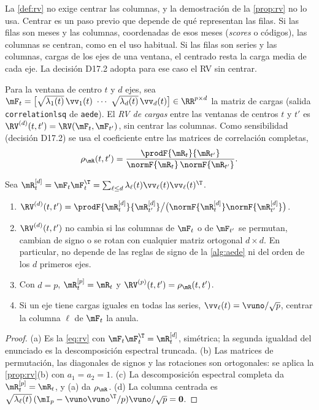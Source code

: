 La \cref{def:rv} no exige centrar las columnas, y la demostración de la \cref{prop:rv} no lo usa.
Centrar es un paso previo que depende de qué representan las filas. Si las filas son meses y las
columnas, coordenadas de esos meses (\emph{scores} o códigos), las columnas se centran, como en el
uso habitual. Si las filas son series y las columnas, cargas de los ejes de una ventana, el
centrado resta la carga media de cada eje. La decisión D17.2 adopta para ese caso el RV sin
centrar.

\begin{definicion}\label{def:rv-cargas}
Para la ventana de centro $t$ y $d$ ejes, sea
$\mF_t=\bigl[\sqrt{\lambda_1(t)}\,\vv_1(t)\ \cdots\ \sqrt{\lambda_d(t)}\,\vv_d(t)\bigr]\in
\RR^{p\times d}$ la matriz de cargas (salida \texttt{correlationlsq} de \texttt{aede}). El
\emph{RV de cargas} entre las ventanas de centros $t$ y $t'$ es $\RV^{(d)}(t,t')=\RV(\mF_t,
\mF_{t'})$, sin centrar las columnas. Como sensibilidad (decisión D17.2) se usa el coeficiente
entre las matrices de correlación completas,
\[
  \rho_{\mR}(t,t')=\frac{\prodF{\mR_t}{\mR_{t'}}}{\normF{\mR_t}\,\normF{\mR_{t'}}}.
\]
\end{definicion}

\begin{proposicion}\label{prop:rv-cargas}
Sea $\mR^{[d]}_t=\mF_t\mF_t^{\T}=\sum_{\ell\le d}\lambda_\ell(t)\vv_\ell(t)\vv_\ell(t)^{\T}$.
\begin{enumerate}[label=(\alph*)]
  \item $\RV^{(d)}(t,t')=\prodF{\mR^{[d]}_t}{\mR^{[d]}_{t'}}\big/\bigl(\normF{\mR^{[d]}_t}
    \normF{\mR^{[d]}_{t'}}\bigr)$.
  \item $\RV^{(d)}(t,t')$ no cambia si las columnas de $\mF_t$ o de $\mF_{t'}$ se permutan, cambian de
    signo o se rotan con cualquier matriz ortogonal $d\times d$. En particular, no depende de las
    reglas de signo de la \cref{alg:aede} ni del orden de los $d$ primeros ejes.
  \item Con $d=p$, $\mR^{[p]}_t=\mR_t$ y $\RV^{(p)}(t,t')=\rho_{\mR}(t,t')$.
  \item Si un eje tiene cargas iguales en todas las series, $\vv_\ell(t)=\vuno/\sqrt p$, centrar la
    columna $\ell$ de $\mF_t$ la anula.
\end{enumerate}
\end{proposicion}

\begin{proof}
(a) Es la \cref{eq:rv} con $\mF_t\mF_t^{\T}=\mR^{[d]}_t$, simétrica; la segunda igualdad del
enunciado es la descomposición espectral truncada. (b) Las matrices de permutación, las diagonales
de signos y las rotaciones son ortogonales: se aplica la \cref{prop:rv}(b) con $a_1=a_2=1$.
(c) La descomposición espectral completa da $\mR^{[p]}_t=\mR_t$, y (a) da $\rho_{\mR}$. (d) La
columna centrada es $\sqrt{\lambda_\ell(t)}\,(\mI_p-\vuno\vuno^{\T}/p)\vuno/\sqrt p=\mathbf{0}$.
\end{proof}

